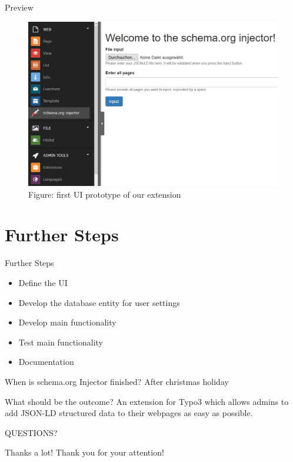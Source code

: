 \documentclass{beamer}
\begin{document}
\begin{frame}{Preview}
\begin{figure}[ht]
\centering
\includegraphics[width=1.0\textwidth]{screenshot2.png}
\caption{Figure: first UI prototype of our extension}
\end{figure}
\end{frame}


\section{Further Steps}

\begin{frame}{Further Steps}

\begin{itemize}
\item Define the UI
\item Develop the database entity for user settings
\item Develop main functionality
\item Test main functionality
\item Documentation
\end{itemize}


\begin{block}{When is schema.org Injector finished?}
After christmas holiday
\end{block}

\begin{block}{What should be the outcome?}
An extension for Typo3 which allows admins to add JSON-LD structured data to their webpages as easy as possible.
\end{block}
\end{frame}

\begin{frame}{}
	QUESTIONS?
\end{frame}

\begin{frame}{Thanks a lot!}
	Thank you for your attention!
\end{frame}
\end{document}
